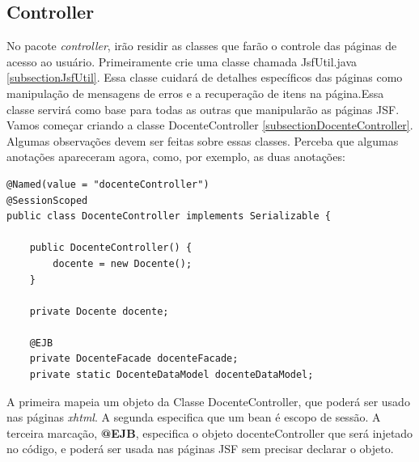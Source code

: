 \documentclass[12pt,a4paper]{article}
\begin{document}
%

\subsection{Controller}
No pacote \textit{controller}, irão residir as classes que farão o controle das páginas de acesso ao usuário. Primeiramente crie uma classe chamada JsfUtil.java \ref{subsectionJsfUtil}. Essa classe cuidará de detalhes específicos das páginas como manipulação de mensagens de erros e a recuperação de itens na página.Essa classe servirá como base para todas as outras que manipularão as páginas JSF. \\

Vamos começar criando a classe DocenteController \ref{subsectionDocenteController}.
Algumas observações devem ser feitas sobre essas classes. Perceba que algumas anotações apareceram agora, como, por exemplo, as duas anotações:
\lstset{language=JAVA}
\begin{lstlisting}
@Named(value = "docenteController")
@SessionScoped
public class DocenteController implements Serializable {

    public DocenteController() {
        docente = new Docente();
    }

    private Docente docente;

    @EJB
    private DocenteFacade docenteFacade;
    private static DocenteDataModel docenteDataModel;
\end{lstlisting}

A primeira mapeia um objeto da Classe DocenteController, que poderá ser usado nas páginas  \textit{xhtml}. A segunda especifica que um bean é escopo de sessão. A terceira marcação, \textbf{@EJB}, especifica o objeto docenteController que será injetado no código, e poderá ser usada nas páginas JSF sem precisar declarar o objeto.\\
\end{document}
